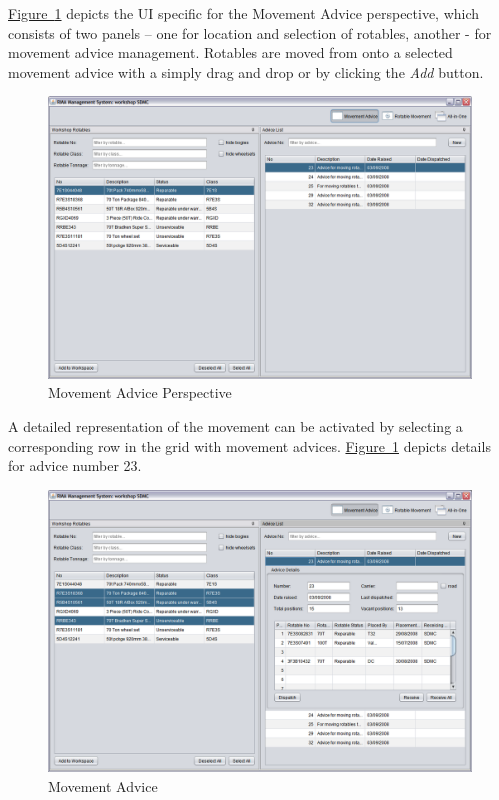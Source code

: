 \hyperref[fig:01-movement-advice-perspective]{Figure~\ref*{fig:01-movement-advice-perspective}} depicts the UI specific for the Movement Advice perspective, which consists of two panels -- one for location and selection of rotables, another - for movement advice management. Rotables are moved from onto a selected movement advice with a simply drag and drop or by clicking the \emph{Add} button.

\begin{figure}[!h]
\centering
\includegraphics[scale=0.37]{chapters/02-user-interface/images/01-movement-advice-perspective.png}
\caption{Movement Advice Perspective}\label{fig:01-movement-advice-perspective}
\end{figure}

A detailed representation of the movement can be activated by selecting a corresponding row in the grid with movement advices. \hyperref[fig:01-movement-advice-perspective]{Figure~\ref*{fig:01-movement-advice-perspective}} depicts details for advice number 23.

\begin{figure}[!h]
\centering
\includegraphics[scale=0.37]{chapters/02-user-interface/images/02-movement-advice-perspective-expanded.png}
\caption{Movement Advice }\label{fig:02-movement-advice-perspective-expanded}
\end{figure}

